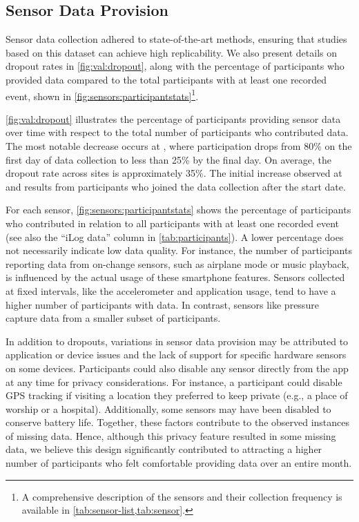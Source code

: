 \subsection{Sensor Data Provision}

Sensor data collection adhered to state-of-the-art methods, ensuring that studies based on this dataset can achieve high replicability. We also present details on dropout rates in \cref{fig:val:dropout}, along with the percentage of participants who provided data compared to the total participants with at least one recorded event, shown in \cref{fig:sensors:participantstats}\footnote{A comprehensive description of the sensors and their collection frequency is available in \cref{tab:sensor-list,tab:sensor}.}.

\cref{fig:val:dropout} illustrates the percentage of participants providing sensor data over time with respect to the total number of participants who contributed data. The most notable decrease occurs at \AMRITA, where participation drops from 80\% on the first day of data collection to less than 25\% by the final day. On average, the dropout rate across sites is approximately 35\%. The initial increase observed at \JLU and \IPICYT results from participants who joined the data collection after the start date.

For each sensor, \cref{fig:sensors:participantstats} shows the percentage of participants who contributed in relation to all participants with at least one recorded event (see also the “iLog data” column in \cref{tab:participants}). A lower percentage does not necessarily indicate low data quality. For instance, the number of participants reporting data from on-change sensors, such as airplane mode or music playback, is influenced by the actual usage of these smartphone features. Sensors collected at fixed intervals, like the accelerometer and application usage, tend to have a higher number of participants with data. In contrast, sensors like pressure capture data from a smaller subset of participants.

\noindent
In addition to dropouts, variations in sensor data provision may be attributed to application or device issues and the lack of support for specific hardware sensors on some devices. Participants could also disable any sensor directly from the app at any time for privacy considerations. For instance, a participant could disable GPS tracking if visiting a location they preferred to keep private (e.g., a place of worship or a hospital). Additionally, some sensors may have been disabled to conserve battery life. Together, these factors contribute to the observed instances of missing data. Hence, although this privacy feature resulted in some missing data, we believe this design significantly contributed to attracting a higher number of participants who felt comfortable providing data over an entire month.


